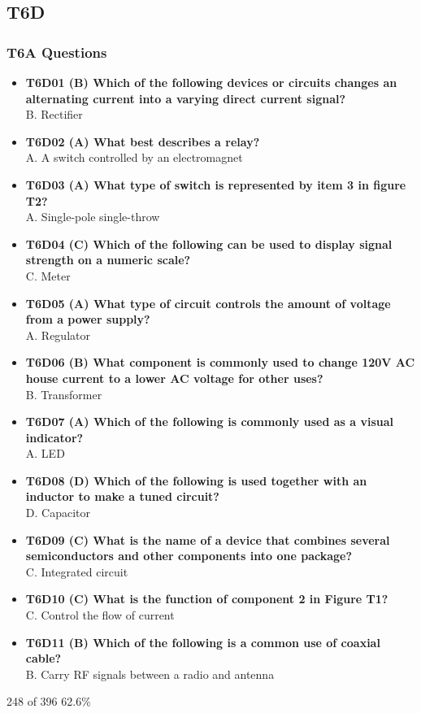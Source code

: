 \documentclass[10pt]{beamer}
\begin{document}
\subsection{T6D}
\begin{frame}
\frametitle{T6A Questions}
\tiny
\begin{itemize}
\item\textbf{T6D01 (B) Which of the following devices or circuits changes an alternating current into a varying direct current signal?}\\B. Rectifier
\item\textbf{T6D02 (A) What best describes a relay?}\\A. A switch controlled by an electromagnet
\item\textbf{T6D03 (A) What type of switch is represented by item 3 in figure T2?}\\A. Single-pole single-throw
\item\textbf{T6D04 (C) Which of the following can be used to display signal strength on a numeric scale?}\\C. Meter
\item\textbf{T6D05 (A) What type of circuit controls the amount of voltage from a power supply?}\\A. Regulator
\item\textbf{T6D06 (B) What component is commonly used to change 120V AC house current to a lower AC voltage for other uses?}\\B. Transformer
\item\textbf{T6D07 (A) Which of the following is commonly used as a visual indicator?}\\A. LED
\item\textbf{T6D08 (D) Which of the following is used together with an inductor to make a tuned circuit?}\\D. Capacitor
\item\textbf{T6D09 (C) What is the name of a device that combines several semiconductors and other components into one package?}\\C. Integrated circuit
\item\textbf{T6D10 (C) What is the function of component 2 in Figure T1?}\\C. Control the flow of current
\item\textbf{T6D11 (B) Which of the following is a common use of coaxial cable?}\\B. Carry RF signals between a radio and antenna
\end{itemize}
\tiny 248 of 396  62.6\%
\end{frame}
\end{document}
